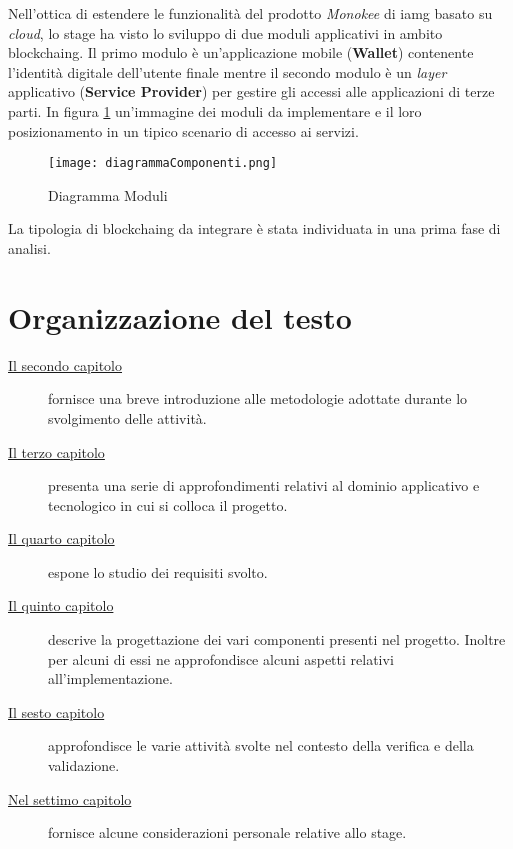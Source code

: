 Nell’ottica di estendere le funzionalità del prodotto \textit{Monokee} di \gls{iamg} basato su \textit{cloud}, lo stage ha visto lo sviluppo di due moduli applicativi in ambito \gls{blockchaing}\glsfirstoccur.
Il primo modulo è un’applicazione mobile (\textbf{Wallet}) contenente l’identità digitale dell’utente finale mentre il secondo modulo è un \textit{layer} applicativo (\textbf{Service Provider}) per gestire gli accessi alle applicazioni di terze parti.
In figura \ref{fig:diag-mod} un’immagine dei moduli da implementare e il loro posizionamento in un tipico scenario di accesso ai servizi.
\begin{figure}[!h]
    
    \centering
    \texttt{[image: diagrammaComponenti.png]} 
    \caption{Diagramma Moduli}
    \label{fig:diag-mod} 
\end{figure}
La tipologia di \gls{blockchaing} da integrare è stata individuata in una prima fase di analisi.

\section{Organizzazione del testo}

\begin{description}
    \item[{\hyperref[cap:processi-metodologie]{Il secondo capitolo}}] fornisce una breve introduzione alle metodologie adottate durante lo svolgimento delle attività.
    
    \item[{\hyperref[cap:descrizione-stage]{Il terzo capitolo}}] presenta una serie di approfondimenti relativi al dominio applicativo e tecnologico in cui si colloca il progetto.
    
    \item[{\hyperref[cap:analisi-requisiti]{Il quarto capitolo}}] espone lo studio dei requisiti svolto.
    
    \item[{\hyperref[cap:progettazione-codifica]{Il quinto capitolo}}] descrive la progettazione dei vari componenti presenti nel progetto. Inoltre per alcuni di essi ne approfondisce alcuni aspetti relativi all'implementazione.
    
    \item[{\hyperref[cap:verifica-validazione]{Il sesto capitolo}}] approfondisce le varie attività svolte nel contesto della verifica e della validazione.
    
    \item[{\hyperref[cap:conclusioni]{Nel settimo capitolo}}] fornisce alcune considerazioni personale relative allo stage.
\end{description}

